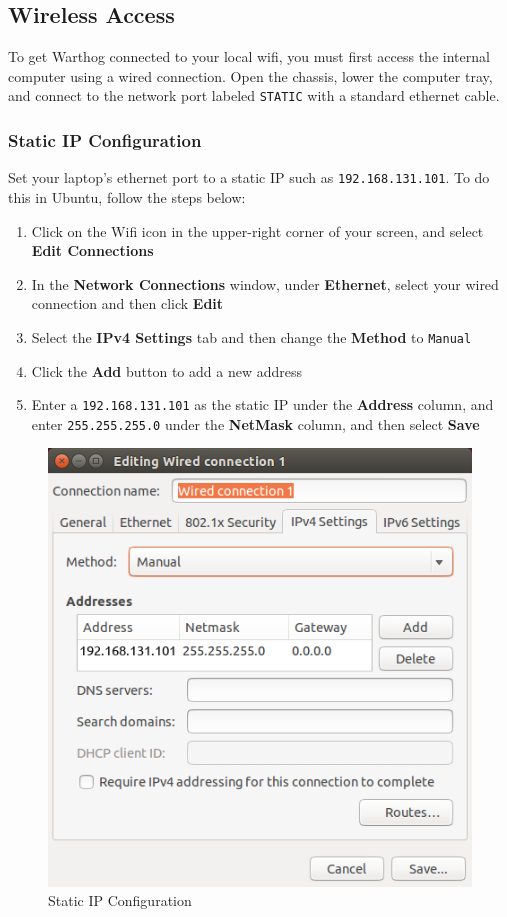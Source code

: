 \documentclass[]{clearpath-latex/clearpath-manual}
\begin{document}
\pagebreak[4]


\subsection{Wireless Access}

To get Warthog connected to your local wifi, you must first access the internal computer
using a wired connection. Open the chassis, lower the computer tray, and connect to the network port
labeled \lstinline{STATIC} with a standard ethernet cable.

\subsubsection{Static IP Configuration}

Set your laptop's ethernet port to a static IP such as \lstinline{192.168.131.101}.  To do this in Ubuntu, follow the steps below:
\begin{enumerate}
  \item Click on the Wifi icon in the upper-right corner of your screen, and select \textbf{Edit Connections}
  \item In the \textbf{Network Connections} window, under \textbf{Ethernet}, select your wired connection and then click \textbf{Edit}
  \item Select the \textbf{IPv4 Settings} tab and then change the \textbf{Method} to \lstinline{Manual}
  \item Click the \textbf{Add} button to add a new address
  \item Enter a \lstinline{192.168.131.101} as the static IP under the \textbf{Address} column, and enter \lstinline{255.255.255.0} under the \textbf{NetMask} column, and then select \textbf{Save}
\end{enumerate}

\begin{figure}[h]
  \centering
  \includegraphics[width=0.5\linewidth]{wired_connection.png}
  \caption{Static IP Configuration}
  \label{staticip}
\end{figure}
\end{document}
